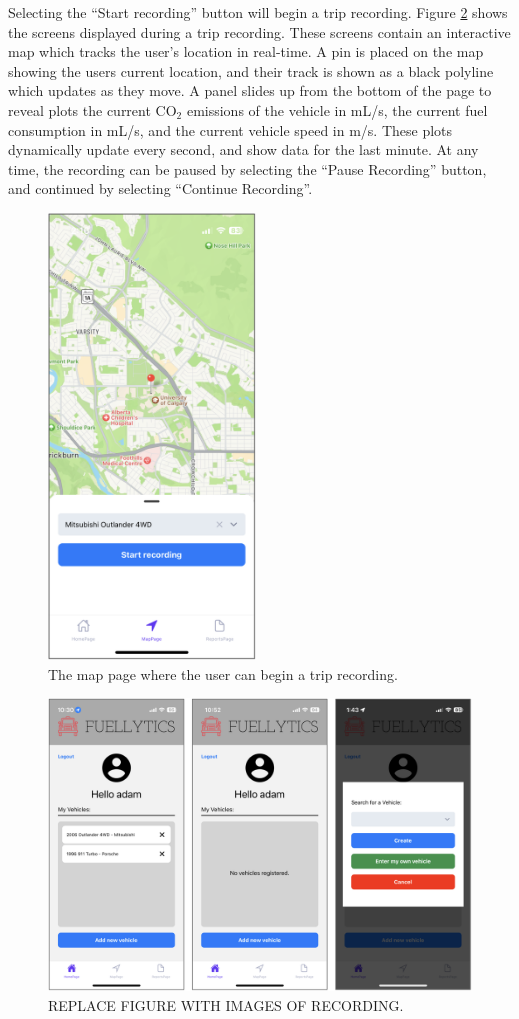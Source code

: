 \documentclass[11pt, oneside]{article}
\begin{document}
Selecting the ``Start recording'' button will begin a trip recording.  Figure \ref*{fig:recording} shows the screens displayed during a trip recording.  These screens contain an interactive map which tracks the user's location in real-time.  A pin is placed on the map showing the users current location, and their track is shown as a black polyline which updates as they move.  A panel slides up from the bottom of the page to reveal plots the current CO$_2$ emissions of the vehicle in mL/s, the current fuel consumption in mL/s, and the current vehicle speed in m/s.  These plots dynamically update every second, and show data for the last minute.  At any time, the recording can be paused by selecting the ``Pause Recording'' button, and continued by selecting ``Continue Recording''.  
\begin{figure}[!t]
\centerline{\includegraphics[width=5.5cm]{img/mapinit.png}}
\caption{\label{fig:mappage} The map page where the user can begin a trip recording.}
\end{figure}
\begin{figure}[H]
\centerline{\includegraphics[width=16.5cm]{img/homepage.png}}
\caption{\label{fig:recording} REPLACE FIGURE WITH IMAGES OF RECORDING.}
\end{figure}
\end{document}
